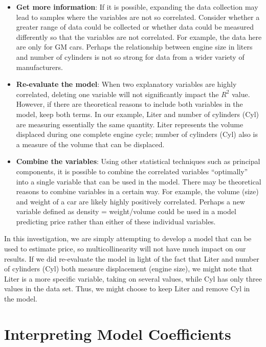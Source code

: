 \documentclass[
]{report}
\providecommand{\tightlist}{%
  \setlength{\itemsep}{0pt}\setlength{\parskip}{0pt}}
\begin{document}
\begin{itemize}
\tightlist
\item
  \textbf{Get more information}: If it is possible, expanding the data collection may lead to samples where the variables are not so correlated. Consider whether a greater range of data could be collected or whether data could be measured differently so that the variables are not correlated. For example, the data here are only for GM cars. Perhaps the relationship between engine size in liters and number of cylinders is not so strong for data from a wider variety of manufacturers.
\item
  \textbf{Re-evaluate the model}: When two explanatory variables are highly correlated, deleting one variable will not significantly impact the \(R^2\) value. However, if there are theoretical reasons to include both variables in the model, keep both terms. In our example, Liter and number of cylinders (Cyl) are measuring essentially the same quantity. Liter represents the volume displaced during one complete engine cycle; number of cylinders (Cyl) also is a measure of the volume that can be displaced.
\item
  \textbf{Combine the variables}: Using other statistical techniques such as principal components, it is possible to combine the correlated variables ``optimally'' into a single variable that can be used in the model. There may be theoretical reasons to combine variables in a certain way. For example, the volume (size) and weight of a car are likely highly positively correlated. Perhaps a new variable defined as density = weight/volume could be used in a model predicting price rather than either of these individual variables.
\end{itemize}

In this investigation, we are simply attempting to develop a model that can be used to estimate price, so multicollinearity will not have much impact on our results. If we did re-evaluate the model in light of the fact that Liter and number of cylinders (Cyl) both measure displacement (engine size), we might note that Liter is a more specific variable, taking on several values, while Cyl has only three values in the data set. Thus, we might choose to keep Liter and remove Cyl in the model.

\hypertarget{interpreting-model-coefficients}{%
\section{\texorpdfstring{\textbf{Interpreting Model Coefficients}}{Interpreting Model Coefficients}}\label{interpreting-model-coefficients}}
\end{document}
